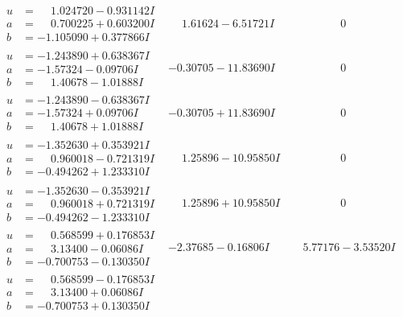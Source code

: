 \documentclass[1p]{elsarticle_modified}
\theoremstyle{definition}
\begin{document}
$$\begin{array}{c|c|c}
\begin{aligned}
u &= \phantom{-}1.024720 - 0.931142 I \\
a &= \phantom{-}0.700225 + 0.603200 I \\
b &= -1.105090 + 0.377866 I\end{aligned}
 & \phantom{-}1.61624 - 6.51721 I & \phantom{-0.000000 } 0 \\ \hline\begin{aligned}
u &= -1.243890 + 0.638367 I \\
a &= -1.57324 - 0.09706 I \\
b &= \phantom{-}1.40678 - 1.01888 I\end{aligned}
 & -0.30705 - 11.83690 I & \phantom{-0.000000 } 0 \\ \hline\begin{aligned}
u &= -1.243890 - 0.638367 I \\
a &= -1.57324 + 0.09706 I \\
b &= \phantom{-}1.40678 + 1.01888 I\end{aligned}
 & -0.30705 + 11.83690 I & \phantom{-0.000000 } 0 \\ \hline\begin{aligned}
u &= -1.352630 + 0.353921 I \\
a &= \phantom{-}0.960018 - 0.721319 I \\
b &= -0.494262 + 1.233310 I\end{aligned}
 & \phantom{-}1.25896 - 10.95850 I & \phantom{-0.000000 } 0 \\ \hline\begin{aligned}
u &= -1.352630 - 0.353921 I \\
a &= \phantom{-}0.960018 + 0.721319 I \\
b &= -0.494262 - 1.233310 I\end{aligned}
 & \phantom{-}1.25896 + 10.95850 I & \phantom{-0.000000 } 0 \\ \hline\begin{aligned}
u &= \phantom{-}0.568599 + 0.176853 I \\
a &= \phantom{-}3.13400 - 0.06086 I \\
b &= -0.700753 - 0.130350 I\end{aligned}
 & -2.37685 - 0.16806 I & \phantom{-}5.77176 - 3.53520 I \\ \hline\begin{aligned}
u &= \phantom{-}0.568599 - 0.176853 I \\
a &= \phantom{-}3.13400 + 0.06086 I \\
b &= -0.700753 + 0.130350 I\end{aligned}

\end{array}$$
\end{document}
